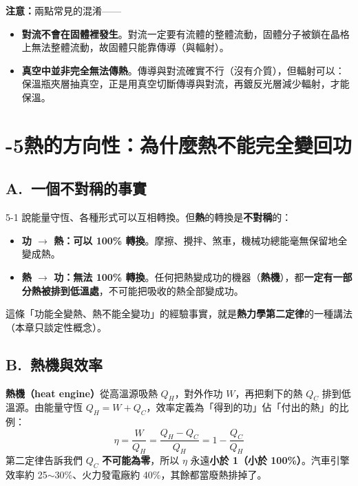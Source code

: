 \documentclass[11pt]{article}
\begin{document}

\textbf{注意：}兩點常見的混淆——
\begin{itemize}\setlength{\itemsep}{1pt}
\item \textbf{對流不會在固體裡發生}。對流一定要有流體的整體流動，固體分子被鎖在晶格上無法整體流動，故固體只能靠傳導（與輻射）。
\item \textbf{真空中並非完全無法傳熱}。傳導與對流確實不行（沒有介質），但輻射可以：保溫瓶夾層抽真空，正是用真空切斷傳導與對流，再鍍反光層減少輻射，才能保溫。
\end{itemize}

\section*{-5\quad 熱的方向性：為什麼熱不能完全變回功}

\subsection*{\sffamily A.\ 一個不對稱的事實}

5-1 說能量守恆、各種形式可以互相轉換。但\textbf{熱}的轉換是\textbf{不對稱}的：

\begin{itemize}\setlength{\itemsep}{1pt}
\item \textbf{功 $\rightarrow$ 熱：可以 100\% 轉換}。摩擦、攪拌、煞車，機械功總能毫無保留地全變成熱。
\item \textbf{熱 $\rightarrow$ 功：無法 100\% 轉換}。任何把熱變成功的機器（\textbf{熱機}），都\textbf{一定有一部分熱被排到低溫處}，不可能把吸收的熱全部變成功。
\end{itemize}

這條「功能全變熱、熱不能全變功」的經驗事實，就是\textbf{熱力學第二定律}的一種講法（本章只談定性概念）。


\subsection*{\sffamily B.\ 熱機與效率}

\textbf{熱機（heat engine）}從高溫源吸熱 $Q_H$，對外作功 $W$，再把剩下的熱 $Q_C$ 排到低溫源。由能量守恆 $Q_H=W+Q_C$，效率定義為「得到的功」佔「付出的熱」的比例：
$$\boxed{\;\eta=\frac{W}{Q_H}=\frac{Q_H-Q_C}{Q_H}=1-\frac{Q_C}{Q_H}\;}$$
第二定律告訴我們 $Q_C$ \textbf{不可能為零}，所以 $\eta$ 永遠\textbf{小於 1（小於 100\%）}。汽車引擎效率約 25$\sim$30\%、火力發電廠約 40\%，其餘都當廢熱排掉了。
\end{document}
